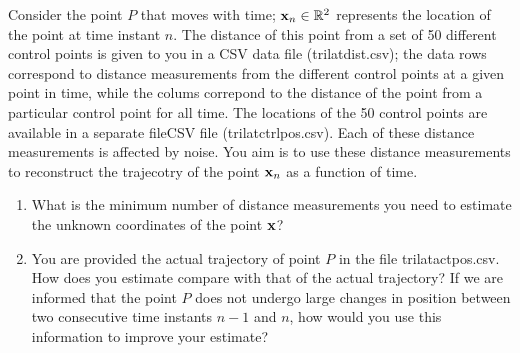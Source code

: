 \documentclass[9pt]{article}
\def\mf{\ensuremath\mathbf}
\def\mb{\ensuremath\mathbb}
\begin{document}
\begin{multicols}{2}
\begin{enumerate}
    Consider the point $P$ that moves with time; $\mf{x}_n \in \mb{R}^{2}$ represents the location of the point at time instant $n$. The distance of this point from a set of 50 different control points is given to you in a CSV data file (trilatdist.csv); the data rows correspond to distance measurements from the different control points at a given point in time, while the colums correpond to the distance of the point from a particular control point for all time. The locations of the 50 control points are available in a separate fileCSV file (trilatctrlpos.csv). Each of these distance measurements is affected by noise. You aim is to use these distance measurements to reconstruct the trajecotry of the point $\mf{x}_n$ as a function of time.
    \begin{enumerate}
        \item What is the minimum number of distance measurements you need to estimate the unknown coordinates of the point $\mf{x}$?
        \item You are provided the actual trajectory of point $P$ in the file trilatactpos.csv. How does you estimate compare with that of the actual trajectory? If we are informed that the point $P$ does not undergo large changes in position between two consecutive time instants $n-1$ and $n$, how would you use this information to improve your estimate?
    \end{enumerate}
\end{enumerate}

\end{multicols}
\end{document}
